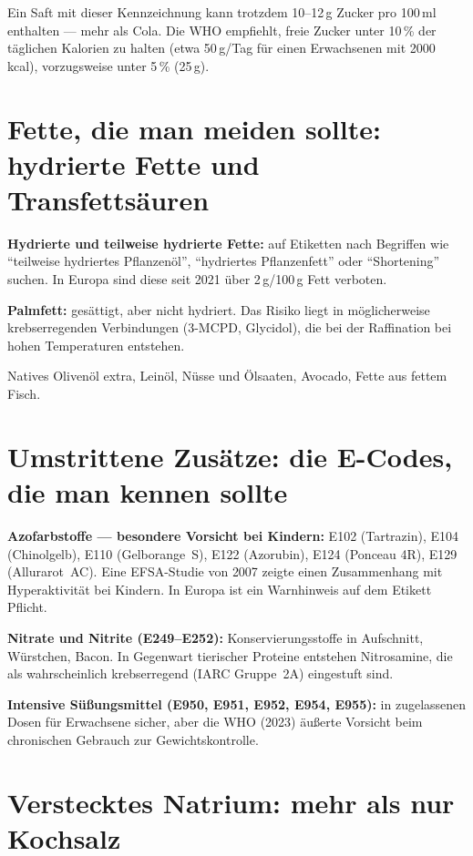 \documentclass[a5paper,12pt,oneside,openany]{book}
\newcommand{\boxgruen}[2]{%
  \begin{tcolorbox}[kastenbase,
    colback=verdescuro!8!white, colframe=verdescuro, title={#1}]
  #2\end{tcolorbox}}
\newcommand{\boxgelb}[2]{%
  \begin{tcolorbox}[kastenbase,
    colback=gelb!12!white, colframe=gelb!80!black, title={#1}]
  #2\end{tcolorbox}}
\begin{document}
\boxgelb{Die Falle ``ohne Zuckerzusatz''}{Ein Saft mit dieser Kennzeichnung
kann trotzdem 10--12\,g Zucker pro 100\,ml enthalten --- mehr als Cola. Die
WHO empfiehlt, freie Zucker unter 10\,\% der t\"{a}glichen Kalorien zu halten
(etwa 50\,g/Tag f\"{u}r einen Erwachsenen mit 2000\,kcal), vorzugsweise
unter 5\,\% (25\,g).}

\section{Fette, die man meiden sollte: hydrierte Fette und Transfetts\"{a}uren}

\textbf{Hydrierte und teilweise hydrierte Fette:} auf Etiketten nach Begriffen
wie ``teilweise hydriertes Pflanzen\"{o}l'', ``hydriertes Pflanzenfett'' oder
``Shortening'' suchen. In Europa sind diese seit 2021 \"{u}ber 2\,g/100\,g
Fett verboten.

\textbf{Palmfett:} ges\"{a}ttigt, aber nicht hydriert. Das Risiko liegt in
m\"{o}glicherweise krebserregenden Verbindungen (3-MCPD, Glycidol), die bei
der Raffination bei hohen Temperaturen entstehen.

\boxgruen{Unbedenkliche Fette}{Natives Oliven\"{o}l extra, Lein\"{o}l, N\"{u}sse
und \"{O}lsaaten, Avocado, Fette aus fettem Fisch.}

\section{Umstrittene Zus\"{a}tze: die E-Codes, die man kennen sollte}

\textbf{Azofarbstoffe --- besondere Vorsicht bei Kindern:}
E102 (Tartrazin), E104 (Chinolgelb), E110 (Gelborange~S), E122 (Azorubin),
E124 (Ponceau 4R), E129 (Allurarot~AC). Eine EFSA-Studie von 2007 zeigte einen
Zusammenhang mit Hyperaktivit\"{a}t bei Kindern. In Europa ist ein Warnhinweis
auf dem Etikett Pflicht.

\textbf{Nitrate und Nitrite (E249--E252):} Konservierungsstoffe in Aufschnitt,
W\"{u}rstchen, Bacon. In Gegenwart tierischer Proteine entstehen Nitrosamine,
die als wahrscheinlich krebserregend (IARC Gruppe~2A) eingestuft sind.

\textbf{Intensive S\"{u}{\ss}ungsmittel (E950, E951, E952, E954, E955):}
in zugelassenen Dosen f\"{u}r Erwachsene sicher, aber die WHO (2023) \"{a}u{\ss}erte
Vorsicht beim chronischen Gebrauch zur Gewichtskontrolle.

\section{Verstecktes Natrium: mehr als nur Kochsalz}
\end{document}
